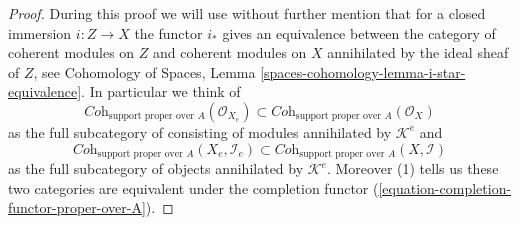 \begin{proof}
During this proof we will use without further mention that for a closed
immersion $i : Z \to X$ the functor $i_*$ gives an equivalence between the
category of coherent modules on $Z$ and coherent modules on $X$ annihilated
by the ideal sheaf of $Z$, see
Cohomology of Spaces, Lemma \ref{spaces-cohomology-lemma-i-star-equivalence}.
In particular we think of
$$
\textit{Coh}_{\text{support proper over } A}(\mathcal{O}_{X_e})
\subset
\textit{Coh}_{\text{support proper over } A}(\mathcal{O}_X)
$$
as the full subcategory of consisting of modules annihilated by
$\mathcal{K}^e$ and
$$
\textit{Coh}_{\text{support proper over } A}(X_e, \mathcal{I}_e)
\subset
\textit{Coh}_{\text{support proper over } A}(X, \mathcal{I})
$$
as the full subcategory of objects annihilated by $\mathcal{K}^e$.
Moreover (1) tells us these two categories are equivalent under the
completion functor (\ref{equation-completion-functor-proper-over-A}).


\end{proof}
